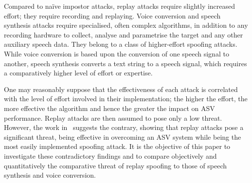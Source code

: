 Compared to na\"{i}ve impostor attacks, replay attacks require slightly increased effort; they require recording and replaying. Voice conversion and speech synthesis attacks require specialised, often complex algorithms, in addition to any recording hardware to collect, analyse and parametrise the target and any other auxiliary speech data.  They belong to a class of higher-effort spoofing attacks.  While voice conversion is based upon the conversion of one speech signal to another, speech synthesis converts a text string to a speech signal, which requires a comparatively higher level of effort or expertise.

One may reasonably suppose that the effectiveness of each attack is correlated with the level of effort involved in their implementation; the higher the effort, the more effective the algorithm and hence the greater the impact on ASV performance.  Replay attacks are then assumed to pose only a low threat.  However, the work in~\cite{Alegre2014} suggests the contrary, showing that replay attacks pose a significant threat, being effective in overcoming an ASV system while being the most easily implemented spoofing attack.  It is the objective of this paper to investigate these contradictory findings and to compare objectively and quantitatively the comparative threat of replay spoofing to those of speech synthesis and voice conversion.
